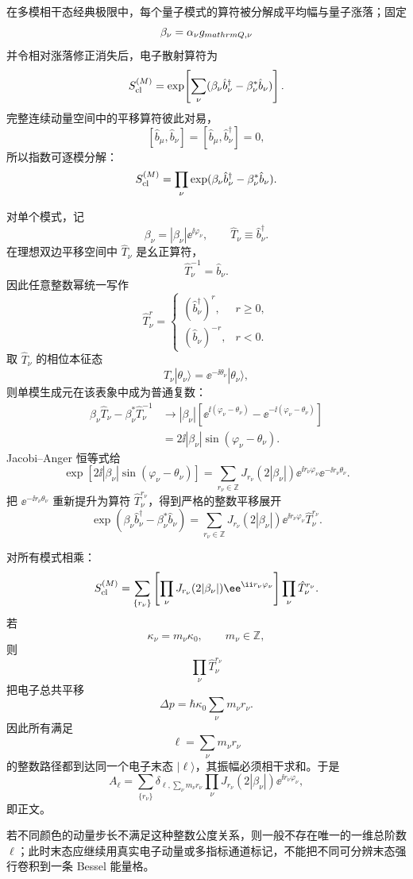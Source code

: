 \begin{derivation}

在多模相干态经典极限中，每个量子模式的算符被分解成平均幅与量子涨落；固定
\[
\beta_\nu=\alpha_\nu g_{\\mathrm Q,\nu}
\]
并令相对涨落修正消失后，电子散射算符为
\[
S_{\rm cl}^{(M)}
=
\exp\!\left[
\sum_\nu
(\beta_\nu\hat b_\nu^\dagger-\beta_\nu^*\hat b_\nu)
\right].
\]
完整连续动量空间中的平移算符彼此对易，
\[
[\hat b_\mu,\hat b_\nu]=
[\hat b_\mu,\hat b_\nu^\dagger]=0,
\]
所以指数可逐模分解：
\[
S_{\rm cl}^{(M)}
=
\prod_\nu
\exp(
\beta_\nu\hat b_\nu^\dagger
-\beta_\nu^*\hat b_\nu).
\]

对单个模式，记
\[
\beta_\nu=|\beta_\nu|\ee^{\ii\varphi_\nu},
\qquad
\hat T_\nu\equiv\hat b_\nu^\dagger.
\]
在理想双边平移空间中 $\hat T_\nu$ 是幺正算符，
\[
\hat T_\nu^{-1}=\hat b_\nu.
\]
因此任意整数幂统一写作
\[
\hat T_\nu^{r}
=
\begin{cases}
(\hat b_\nu^\dagger)^r,&r\ge0,\\
(\hat b_\nu)^{-r},&r<0.
\end{cases}
\]
取 $\hat T_\nu$ 的相位本征态
\[
\hat T_\nu|\theta_\nu\rangle
=
\ee^{-\ii\theta_\nu}|\theta_\nu\rangle,
\]
则单模生成元在该表象中成为普通复数：
\begin{align*}
\beta_\nu\hat T_\nu-\beta_\nu^*\hat T_\nu^{-1}
&\longrightarrow
|\beta_\nu|
\left[
\ee^{\ii(\varphi_\nu-\theta_\nu)}
-\ee^{-\ii(\varphi_\nu-\theta_\nu)}
\right]\\
&=
2\ii|\beta_\nu|
\sin(\varphi_\nu-\theta_\nu).
\end{align*}
Jacobi--Anger 恒等式给
\[
\exp[
2\ii|\beta_\nu|\sin(\varphi_\nu-\theta_\nu)
]
=
\sum_{r_\nu\in\mathbb Z}
J_{r_\nu}(2|\beta_\nu|)
\ee^{\ii r_\nu\varphi_\nu}
\ee^{-\ii r_\nu\theta_\nu}.
\]
把
$\ee^{-\ii r_\nu\theta_\nu}$
重新提升为算符 $\hat T_\nu^{r_\nu}$，得到严格的整数平移展开
\[
\exp(
\beta_\nu\hat b_\nu^\dagger
-\beta_\nu^*\hat b_\nu)
=
\sum_{r_\nu\in\mathbb Z}
J_{r_\nu}(2|\beta_\nu|)
\ee^{\ii r_\nu\varphi_\nu}
\hat T_\nu^{r_\nu}.
\]

对所有模式相乘：
\[
S_{\rm cl}^{(M)}
=
\sum_{\{r_\nu\}}
\left[
\prod_\nu
J_{r_\nu}(2|\beta_\nu|)
\ee^{\ii r_\nu\varphi_\nu}
\right]
\prod_\nu\hat T_\nu^{r_\nu}.
\]
若
\[
\kappa_\nu=m_\nu\kappa_0,
\qquad
m_\nu\in\mathbb Z,
\]
则
\[
\prod_\nu\hat T_\nu^{r_\nu}
\]
把电子总共平移
\[
\Delta p
=
\hbar\kappa_0
\sum_\nu m_\nu r_\nu.
\]
因此所有满足
\[
\ell=\sum_\nu m_\nu r_\nu
\]
的整数路径都到达同一个电子末态 $|\ell\rangle$，其振幅必须相干求和。于是
\[
A_\ell
=
\sum_{\{r_\nu\}}
\delta_{\ell,\sum_\nu m_\nu r_\nu}
\prod_\nu
J_{r_\nu}(2|\beta_\nu|)
\ee^{\ii r_\nu\varphi_\nu},
\]
即正文。

若不同颜色的动量步长不满足这种整数公度关系，则一般不存在唯一的一维总阶数 $\ell$；此时末态应继续用真实电子动量或多指标通道标记，不能把不同可分辨末态强行卷积到一条 Bessel 能量格。
\end{derivation}

